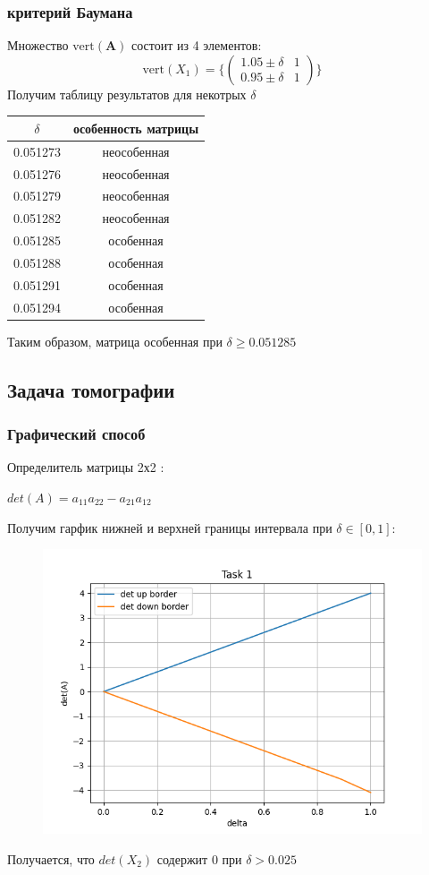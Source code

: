 \documentclass[a4paper,12pt]{article}
\begin{document}
\subsubsection{критерий Баумана}
Множество $\mathrm{vert}(\textbf{A})$ состоит из 4 элементов:
\begin{equation}
\mathrm{vert}(X_1)=
   \biggl\{
        \begin{pmatrix}
        1.05 \pm \delta & 1 \\
        0.95 \pm \delta & 1
        \end{pmatrix}
        \biggl\}
\end{equation}
Получим таблицу результатов для некотрых $\delta$
\begin{table}[H]
\begin{center}
\begin{tabular}{|c|c|}
\hline
$\delta$ & особенность матрицы \\
\hline
0.051273    &    неособенная\\
0.051276    &    неособенная\\
0.051279    &    неособенная\\
0.051282    &    неособенная\\
0.051285    &    особенная\\
0.051288    &    особенная\\
0.051291    &    особенная\\
0.051294    &    особенная\\
\hline
\end{tabular}
\end{center}
\end{table} 
Таким образом, матрица особенная при $\delta \geqslant 0.051285$


\subsection{Задача томографии}
\subsubsection{Графический способ}
Определитель матрицы 2х2 :
\begin{center}
    $det(A) = a_{11}a_{22} - a_{21}a_{12}$
\end{center}
Получим гарфик нижней и верхней границы интервала при $\delta \in [0,1]$:
\begin{figure}[H]
        \centering
        \includegraphics[width=0.5\linewidth]{task1.png}
\end{figure}
Получается, что $det(X_2)$ содержит 0 при $\delta > 0.025$
\end{document}
